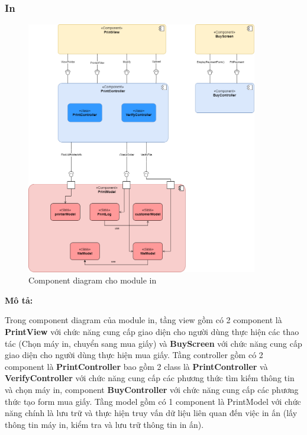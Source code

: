 \subsubsection{In}
\begin{figure}[H]
    \begin{center}
        \includegraphics[width=0.9\textwidth]{Images/Architecture Design/Printing_Component.png}
        \caption{Component diagram cho module in}
    \end{center}
\end{figure}
\textbf{Mô tả:}\par
Trong component diagram của module in, tầng view gồm có 2 component là \textbf{PrintView} với chức năng cung cấp giao diện cho người dùng thực hiện các thao tác (Chọn máy in, chuyển sang mua giấy) và \textbf{BuyScreen} với chức năng cung cấp giao diện cho người dùng thực hiện mua giấy. Tầng controller gồm có 2 component là \textbf{PrintController} bao gồm 2 class là \textbf{PrintController} và \textbf{VerifyController} với chức năng cung cấp các phương thức tìm kiếm thông tin và chọn máy in, component \textbf{BuyController} với chức năng cung cấp các phương thức tạo form mua giấy. Tầng model gồm có 1 component là PrintModel với chức năng chính là lưu trữ và thực hiện truy vấn dữ liệu liên quan đến việc in ấn (lấy thông tin máy in, kiểm tra và lưu trữ thông tin in ấn).\par

